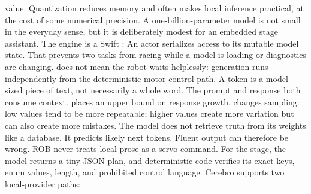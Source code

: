 {}value. Quantization reduces memory and often makes local inference practical,\markdownRendererSoftLineBreak
{}at the cost of some numerical precision. A one-billion-parameter model is not\markdownRendererSoftLineBreak
{}small in the everyday sense, but it is deliberately modest for an embedded\markdownRendererSoftLineBreak
{}stage assistant.\markdownRendererParagraphSeparator
{}The engine is a Swift :\markdownRendererInterblockSeparator
{}\markdownRendererInterblockSeparator
{}An actor serializes access to its mutable model state. That prevents two tasks\markdownRendererSoftLineBreak
{}from racing while a model is loading or diagnostics are changing. \markdownRendererSoftLineBreak
{}does not mean the robot waits helplessly: generation runs independently from\markdownRendererSoftLineBreak
{}the deterministic motor-control path.\markdownRendererInterblockSeparator
{}
\markdownRendererSectionEnd \markdownRendererSectionBegin
{}\markdownRendererInterblockSeparator
{}A token is a model-sized piece of text, not necessarily a whole word. The\markdownRendererSoftLineBreak
{}prompt and response both consume context.  places an upper bound on\markdownRendererSoftLineBreak
{}response growth.  changes sampling: low values tend to be more\markdownRendererSoftLineBreak
{}repeatable; higher values create more variation but can also create more\markdownRendererSoftLineBreak
{}mistakes.\markdownRendererParagraphSeparator
{}The model does not retrieve truth from its weights like a database. It predicts\markdownRendererSoftLineBreak
{}likely next tokens. Fluent output can therefore be wrong. ROB never treats\markdownRendererSoftLineBreak
{}local prose as a servo command. For the stage, the model returns a tiny JSON\markdownRendererSoftLineBreak
{}plan, and deterministic code verifies its exact keys, enum values, length, and\markdownRendererSoftLineBreak
{}prohibited control language.\markdownRendererInterblockSeparator
{}
\markdownRendererSectionEnd \markdownRendererSectionBegin
{}\markdownRendererInterblockSeparator
{}Cerebro supports two local-provider paths:\markdownRendererInterblockSeparator
{}\markdownRendererInterblockSeparator
